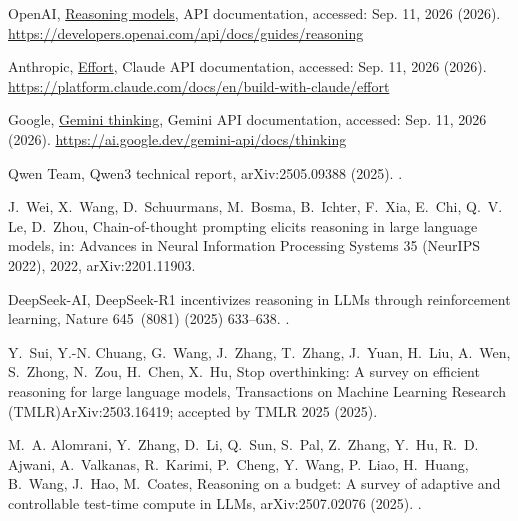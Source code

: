 \documentclass[final,5p,times,twocolumn]{elsarticle}
\theoremstyle{plain}
\begin{document}
{OpenAI},
  \href{https://developers.openai.com/api/docs/guides/reasoning}{Reasoning
  models}, API documentation, accessed: Sep. 11, 2026 (2026).
\newline\urlprefix\url{https://developers.openai.com/api/docs/guides/reasoning}

{Anthropic},
  \href{https://platform.claude.com/docs/en/build-with-claude/effort}{Effort},
  Claude API documentation, accessed: Sep. 11, 2026 (2026).
\newline\urlprefix\url{https://platform.claude.com/docs/en/build-with-claude/effort}

{Google}, \href{https://ai.google.dev/gemini-api/docs/thinking}{Gemini
  thinking}, Gemini API documentation, accessed: Sep. 11, 2026 (2026).
\newline\urlprefix\url{https://ai.google.dev/gemini-api/docs/thinking}

{Qwen Team}, {Qwen3} technical report, arXiv:2505.09388 (2025).
\newblock \href {http://arxiv.org/abs/2505.09388} {}.

J.~Wei, X.~Wang, D.~Schuurmans, M.~Bosma, B.~Ichter, F.~Xia, E.~Chi, Q.~V. Le,
  D.~Zhou, Chain-of-thought prompting elicits reasoning in large language
  models, in: Advances in Neural Information Processing Systems 35 (NeurIPS
  2022), 2022, arXiv:2201.11903.

{DeepSeek-AI}, {DeepSeek-R1} incentivizes reasoning in {LLMs} through
  reinforcement learning, Nature 645~(8081) (2025) 633--638.
\newblock \href {https://doi.org/10.1038/s41586-025-09422-z}
  {}.

Y.~Sui, Y.-N. Chuang, G.~Wang, J.~Zhang, T.~Zhang, J.~Yuan, H.~Liu, A.~Wen,
  S.~Zhong, N.~Zou, H.~Chen, X.~Hu, Stop overthinking: A survey on efficient
  reasoning for large language models, Transactions on Machine Learning
  Research (TMLR)ArXiv:2503.16419; accepted by TMLR 2025 (2025).

M.~A. Alomrani, Y.~Zhang, D.~Li, Q.~Sun, S.~Pal, Z.~Zhang, Y.~Hu, R.~D. Ajwani,
  A.~Valkanas, R.~Karimi, P.~Cheng, Y.~Wang, P.~Liao, H.~Huang, B.~Wang,
  J.~Hao, M.~Coates, Reasoning on a budget: A survey of adaptive and
  controllable test-time compute in {LLMs}, arXiv:2507.02076 (2025).
\newblock \href {http://arxiv.org/abs/2507.02076} {}.
\end{document}
